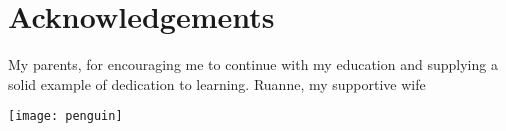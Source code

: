 \chapter*{Acknowledgements}

My parents, for encouraging me to continue with my education and
supplying a solid example of dedication to learning.  Ruanne, my
supportive wife

\vfil

\begin{flushright}
  \texttt{[image: penguin]} 
\end{flushright}

